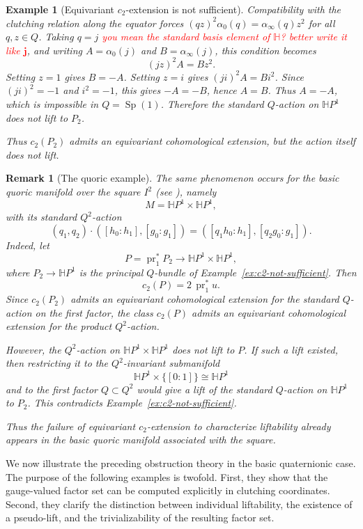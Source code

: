 \documentclass[11pt,a4paper]{article}
\numberwithin{equation}{section}
\newtheorem{remark}[definition]{Remark}
\newtheorem{example}[definition]{Example}
\theoremstyle{named}
\begin{document}
\begin{example}[Equivariant \(c_2\)-extension is not sufficient]
Compatibility with the clutching relation along the equator forces \((qz)^2\alpha_0(q)=\alpha_\infty(q)z^2\) for all \(q,z\in Q\). Taking \(q=j\) \textcolor{red}{you mean the standard basis element of $\mathbb{H}$? better write it like $\textrm{$\mathbf{j}$}$}, and writing \(A=\alpha_0(j)\) and \(B=\alpha_\infty(j)\), this condition becomes
\[
(jz)^2A=Bz^2.
\]
Setting \(z=1\) gives \(B=-A\). Setting \(z=i\) gives \((ji)^2A=Bi^2\). Since \((ji)^2=-1\) and \(i^2=-1\), this gives \(-A=-B\), hence \(A=B\). Thus \(A=-A\), which is impossible in \(Q=\operatorname{Sp}(1)\). Therefore the standard \(Q\)-action on \(\mathbb H P^1\) does not lift to \(P_2\).

Thus \(c_2(P_2)\) admits an equivariant cohomological extension, but the action itself does not lift.
\end{example}

\begin{remark}[The quoric example]
\label{rem:square-quoric-c2-not-sufficient}
The same phenomenon occurs for the basic quoric manifold over the square \(I^2\) (see \cite[Example 4.3.4(2)]{ho}), namely
\[
M=\mathbb H P^1\times \mathbb H P^1,
\]
with its standard \(Q^2\)-action
\[
(q_1,q_2)\cdot([h_0:h_1],[g_0:g_1])
=
([q_1h_0:h_1],[q_2g_0:g_1]).
\]
Indeed, let
\[
P=\operatorname{pr}_1^*P_2\longrightarrow
\mathbb H P^1\times \mathbb H P^1,
\]
where \(P_2\to \mathbb H P^1\) is the principal \(Q\)-bundle of
Example~\ref{ex:c2-not-sufficient}. Then
\[
c_2(P)=2\,\operatorname{pr}_1^*u.
\]
Since \(c_2(P_2)\) admits an equivariant cohomological extension for the standard \(Q\)-action on the first factor, the class \(c_2(P)\) admits an equivariant cohomological extension for the product \(Q^2\)-action.

However, the \(Q^2\)-action on \(\mathbb H P^1\times \mathbb H P^1 \) does not lift to \(P\). If such a lift existed, then restricting it to the \(Q^2\)-invariant submanifold
\[
\mathbb H P^1\times\{[0:1]\}\cong \mathbb H P^1
\]
and to the first factor \(Q\subset Q^2\) would give a lift of the standard \(Q\)-action on \(\mathbb H P^1\) to \(P_2\). This contradicts Example~\ref{ex:c2-not-sufficient}.

Thus the failure of equivariant \(c_2\)-extension to characterize
liftability already appears in the basic quoric manifold associated with the square.
\end{remark}


We now illustrate the preceding obstruction theory in the basic quaternionic case. The purpose of the following examples is twofold. First, they show that the gauge-valued factor set can be computed explicitly in clutching coordinates. Second, they clarify the distinction between individual liftability, the existence of a pseudo-lift, and the trivializability of the resulting factor set.
\end{document}
